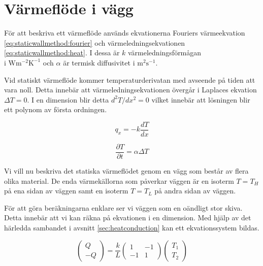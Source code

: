 \section{Värmeflöde i vägg}

För att beskriva ett värmeflöde används ekvationerna Fouriers värmeekvation
\eqref{eq:staticwallmethod:fourier} och värmeledningsekvationen 
\eqref{eq:staticwallmethod:heat}. 
I dessa är
$k$ värmeledningsförmågan\\i $\mbox{W}\mbox{m}^{-2}\mbox{K}^{-1}$ och
$\alpha$ är termisk diffusivitet i $\mbox{m}^2\mbox{s}^{-1}$. \cite{physicshandbook}

Vid statiskt värmeflöde kommer temperaturderivatan med avseende på tiden att vara noll.
Detta innebär att värmeledningsekvationen övergår i Laplaces ekvation
$\Delta{}T = 0$. I en dimension blir detta $d^2T/dx^2 = 0$ vilket innebär
att lösningen blir ett polynom av första ordningen.  

\begin{equation}
\label{eq:staticwallmethod:fourier}
q_x = -k\frac{dT}{dx}
\end{equation}

\begin{equation}
\label{eq:staticwallmethod:heat}
\frac{\partial{}T}{\partial{}t} = \alpha\Delta{}T
\end{equation}

\noindent
Vi vill nu beskriva det statiska värmeflödet genom en vägg som består
av flera olika material. De enda värmekällorna som påverkar väggen
är en isoterm $T = T_H$ på ena sidan av väggen
samt en isoterm $T = T_L$ på andra sidan av väggen.

För att göra beräkningarna enklare
ser vi väggen som en oändligt stor skiva. Detta innebär att vi kan räkna
på ekvationen i en dimension. Med hjälp av det härledda sambandet i avsnitt \ref{sec:heatconduction} kan ett ekvationssystem bildas.

\begin{equation}
\label{eq:staticwalltheory:rodmatrix}
\begin{pmatrix}
Q \\
-Q
\end{pmatrix} = 
\frac{k}{L}\begin{pmatrix}
1 & -1 \\
-1 & 1
\end{pmatrix}
\begin{pmatrix}
T_1 \\
T_2
\end{pmatrix}
\end{equation}

